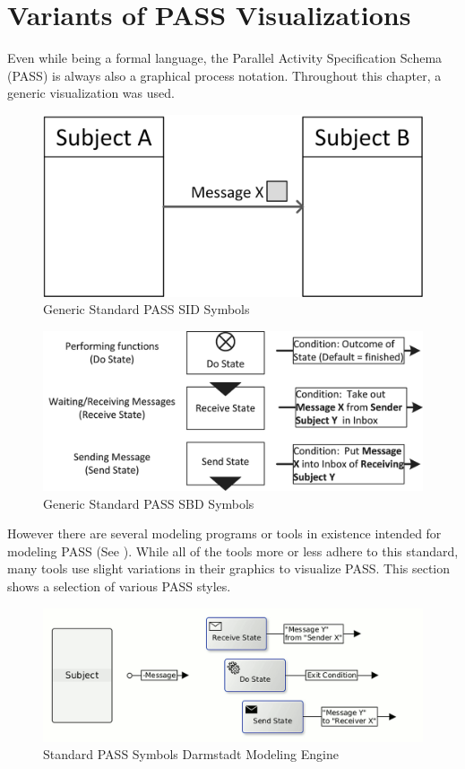 \section{Variants of PASS Visualizations}

Even while being a formal language, the Parallel Activity Specification Schema (PASS) is always also a graphical process notation. Throughout this chapter, a generic visualization was used.

\begin{figure}[htbp]
	\centering
	\includegraphics[width=0.6\linewidth]{Figures/Ontology/SubjectInteraction/GenericPASSSIDSymbols.png}
	\caption[Generic Standard PASS SID Symbols]{Generic Standard PASS SID Symbols}
	\label{fig:genericPASSSIDSymbols}
\end{figure}

\begin{figure}[htbp]
	\centering
	\includegraphics[width=0.8\linewidth]{Figures/Ontology/SubjectBehavior/Behavior-Symbole_NEW2.png}
	\caption[Generic Standard PASS SBD Symbols]{Generic Standard PASS SBD Symbols}
	\label{fig:genericPASSSymbols}
\end{figure}

However there are several modeling programs or tools in existence intended for modeling PASS (See  \cite{toolOverview}). While all of the tools more or less adhere to this standard, many tools use slight variations in their graphics to visualize PASS. This section shows a selection of various PASS styles. 



\begin{figure}[htbp]
	\centering
	\includegraphics[width=0.9\linewidth]{Figures/Ontology/BaseElementsOverviewDarmstadt.png}
	\caption[Standard PASS Symbols Darmstadt Modeling Engine]{Standard PASS Symbols Darmstadt Modeling Engine}
	\label{fig:darmstadtPassSymbols}
\end{figure}

